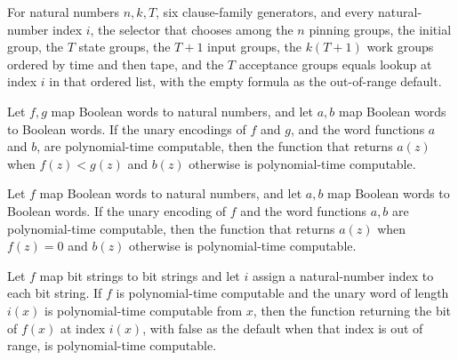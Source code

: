 \begin{lemma}
\label{Complexity.clA5GroupAt_exact}
\leanok
{}
For natural numbers $n,k,T$, six clause-family generators, and every natural-number
index $i$, the selector that chooses among the $n$ pinning groups, the initial group,
the $T$ state groups, the $T+1$ input groups, the $k(T+1)$ work groups ordered by time
and then tape, and the $T$ acceptance groups equals lookup at index $i$ in that ordered
list, with the empty formula as the out-of-range default.
\end{lemma}

\begin{lemma}
\label{Complexity.clA5IfLt_native}
\leanok
{}
Let $f,g$ map Boolean words to natural numbers, and let $a,b$ map Boolean words to
Boolean words. If the unary encodings of $f$ and $g$, and the word functions $a$ and
$b$, are polynomial-time computable, then the function that returns $a(z)$ when
$f(z)<g(z)$ and $b(z)$ otherwise is polynomial-time computable.
\end{lemma}

\begin{lemma}
\label{Complexity.clA5IfZero_native}
\leanok
{}
Let $f$ map Boolean words to natural numbers, and let $a,b$ map Boolean words to Boolean
words. If the unary encoding of $f$ and the word functions $a,b$ are polynomial-time
computable, then the function that returns $a(z)$ when $f(z)=0$ and $b(z)$ otherwise is
polynomial-time computable.
\end{lemma}

\begin{lemma}
\label{Complexity.clA5GetBit_native}
\leanok
{}
Let $f$ map bit strings to bit strings and let $i$ assign a natural-number index to each
bit string. If $f$ is polynomial-time computable and the unary word of length $i(x)$ is
polynomial-time computable from $x$, then the function returning the bit of $f(x)$ at
index $i(x)$, with false as the default when that index is out of range, is
polynomial-time computable.
\end{lemma}

